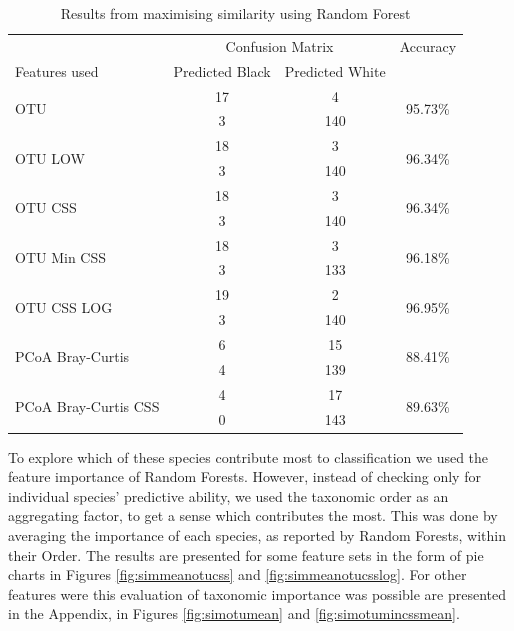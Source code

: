 \begin{table}[!h]
	\centering
	\caption{Results from maximising similarity using Random Forest}
	\label{table:rfrsimilarity}
\begin{tabular}{l c  c c}
	\toprule
	&\multicolumn{2}{c}{Confusion Matrix} & Accuracy\\
	Features used & Predicted Black&Predicted White&\\
	
	\midrule
	\multirow{2}{*}{OTU} &17 &4&\multirow{2}{*}{95.73\%}\\
	&	 3&140&\\
	\cmidrule{2-3}
	\multirow{2}{*}{OTU LOW} &18 &3&\multirow{2}{*}{96.34\%}\\
	&	 3&140&\\
	\cmidrule{2-3}
	\multirow{2}{*}{OTU CSS} &18 &3&\multirow{2}{*}{96.34\%}\\
	&	 3&140&\\
	\cmidrule{2-3}
	\multirow{2}{*}{OTU Min CSS}&18 &3&\multirow{2}{*}{96.18\%}\\
	&	 3&133&\\
	\cmidrule{2-3}
	\multirow{2}{*}{OTU CSS LOG} &19 &2&\multirow{2}{*}{96.95\%}\\
	&	 3&140&\\
	\cmidrule{2-3}
	\multirow{2}{*}{PCoA Bray-Curtis} &6 &15&\multirow{2}{*}{88.41\%}\\
	&	 4&139&\\
	\cmidrule{2-3}
	\multirow{2}{*}{PCoA Bray-Curtis CSS} &4 &17&\multirow{2}{*}{89.63\%}\\
	&	 0&143&\\
	\bottomrule
\end{tabular}

\end{table}

To explore which of these species contribute most to classification we used the feature importance of Random Forests. However, instead of checking only for individual species' predictive ability, we used the taxonomic order as an aggregating factor, to get a sense which contributes the most. This was done by averaging the importance of each species, as reported by Random Forests, within their Order. The results are presented for some feature sets in the form of pie charts in Figures \ref{fig:simmeanotucss} and \ref{fig:simmeanotucsslog}. For other features were this evaluation of taxonomic importance was possible are presented in the Appendix, in Figures \ref{fig:simotumean} and \ref{fig:simotumincssmean}. 

